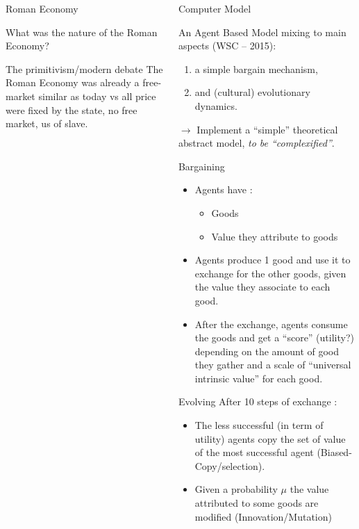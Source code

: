 \documentclass[final]{beamer}
\begin{document}
\begin{frame}
\begin{columns}
	\begin{block}{Roman Economy}
		\begin{center}
			\Huge
			What was the nature of the Roman Economy?\\
		\end{center}

		\vfill

		\begin{block}
			{The primitivism/modern debate}
			The Roman Economy was already a free-market similar as today vs all price were fixed by the state, no free market, us of slave.
		\end{block}
	\end{block}

	\begin{block}{Computer Model}

		An Agent Based Model mixing to main aspects (WSC -- 2015):

		\vfil
		\begin{enumerate}
			\item a	simple bargain mechanism,
			\item and (cultural) evolutionary dynamics.
		\end{enumerate}

		\vfill
		$\rightarrow$ Implement a ``simple'' theoretical abstract model, \emph{to be ``complexified''}.




		\begin{block}{Bargaining}
			\begin{itemize}
				\item Agents have :
					\begin{itemize}
						\item Goods
						\item Value they attribute to goods
					\end{itemize}
				\item Agents produce 1 good and use it to exchange for the other goods, given the value they associate to each good.
				\item After the exchange, agents consume the goods and get a ``score'' (utility?) depending on the amount of good they gather and a scale of ``universal intrinsic value'' for each good.
			\end{itemize}

		\end{block}

		\begin{block}{Evolving}
			After 10 steps of exchange :
			\begin{itemize}
				\item  The less successful (in term of utility) agents copy the set of value of the most successful agent (Biased-Copy/selection).
				\item Given a probability $\mu$ the value attributed to some goods are modified (Innovation/Mutation)
			\end{itemize}


\end{block}
\end{block}
\end{columns}
\end{frame}
\end{document}
